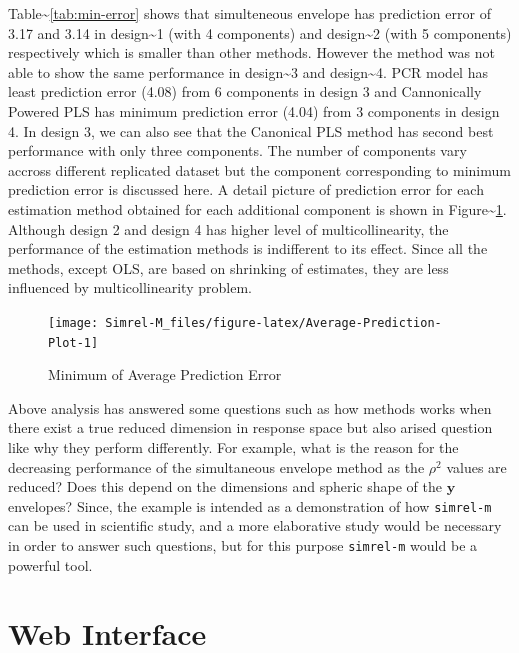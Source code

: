 \documentclass[12pt,A4paper,authoryear]{elsarticle} %
\theoremstyle{definition}
\theoremstyle{definition}
\theoremstyle{remark}
\begin{document}
Table\textasciitilde{}\ref{tab:min-error} shows that simulteneous
envelope has prediction error of 3.17 and 3.14 in
design\textasciitilde{}1 (with 4 components) and
design\textasciitilde{}2 (with 5 components) respectively which is
smaller than other methods. However the method was not able to show the
same performance in design\textasciitilde{}3 and
design\textasciitilde{}4. PCR model has least prediction error (4.08)
from 6 components in design 3 and Cannonically Powered PLS has minimum
prediction error (4.04) from 3 components in design 4. In design 3, we
can also see that the Canonical PLS method has second best performance
with only three components. The number of components vary accross
different replicated dataset but the component corresponding to minimum
prediction error is discussed here. A detail picture of prediction error
for each estimation method obtained for each additional component is
shown in Figure\textasciitilde{}\ref{fig:Average-Prediction-Plot}.
Although design 2 and design 4 has higher level of multicollinearity,
the performance of the estimation methods is indifferent to its effect.
Since all the methods, except OLS, are based on shrinking of estimates,
they are less influenced by multicollinearity problem.

\begin{figure}[H]
\texttt{[image: Simrel-M\_files/figure-latex/Average-Prediction-Plot-1]} \caption{Minimum of Average Prediction Error}\label{fig:Average-Prediction-Plot}
\end{figure}

Above analysis has answered some questions such as how methods works
when there exist a true reduced dimension in response space but also
arised question like why they perform differently. For example, what is
the reason for the decreasing performance of the simultaneous envelope
method as the \(\rho^2\) values are reduced? Does this depend on the
dimensions and spheric shape of the \(\mathbf{y}\) envelopes? Since, the
example is intended as a demonstration of how \texttt{simrel-m} can be
used in scientific study, and a more elaborative study would be
necessary in order to answer such questions, but for this purpose
\texttt{simrel-m} would be a powerful tool.

\section{Web Interface}\label{web-interface}
\end{document}
